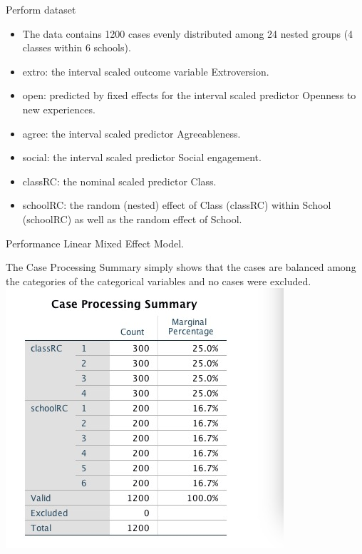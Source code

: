 \documentclass[ignorenonframetext,]{beamer}
\providecommand{\tightlist}{%
  \setlength{\itemsep}{0pt}\setlength{\parskip}{0pt}}
\begin{document}
\begin{frame}{Perform dataset}

\begin{itemize}
\tightlist
\item
  The data contains 1200 cases evenly distributed among 24 nested groups
  (4 classes within 6 schools).
\item
  extro: the interval scaled outcome variable Extroversion.
\item
  open: predicted by fixed effects for the interval scaled predictor
  Openness to new experiences.
\item
  agree: the interval scaled predictor Agreeableness.
\item
  social: the interval scaled predictor Social engagement.
\item
  classRC: the nominal scaled predictor Class.
\item
  schoolRC: the random (nested) effect of Class (classRC) within School
  (schoolRC) as well as the random effect of School.
\end{itemize}

\end{frame}

\begin{frame}{Performance Linear Mixed Effect Model.}

The Case Processing Summary simply shows that the cases are balanced
among the categories of the categorical variables and no cases were
excluded. \includegraphics{Case Processing Summary.jpeg}\\

\end{frame}
\end{document}
